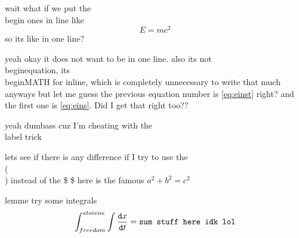 \documentclass[12pt, a4]{article}
\begin{document}
wait what if we put the \\begin{} ones in line
    like \begin{equation} E=mc^{2} \label{eq:einst} \end{equation} so its like in one line?

    yeah okay it does not want to be in one line. also its not \\begin{equation}, its \\begin{MATH} for inline, which is completely unnecessary to write that much anyways
but let me guess the previous equation number is \ref{eq:einst} right? and the first one is \ref{eq:eins}. Did I get that right too??

yeah dumbass cuz I'm cheating with the \\label trick 


lets see if there is any difference if I try to use the \\(  \\) instead of the \$ \$
here is the famous \(a^{2} + b^{2} = c^{2}\)

lemme try some integrals
\begin{equation}
    \int_{freedom}^{stoiene}
    \pagebreak
    \int \frac{\texttt{d}x}{\texttt{d}t}=\texttt{sum stuff here idk lol}
\end{equation}
\end{document}
